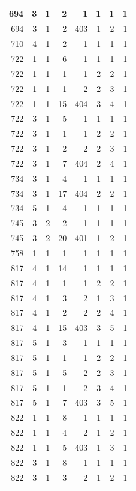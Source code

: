 \documentclass[11pt,]{book}
\begin{document}
\begin{table}
\begin{tabular}[t]{r|r|r|r|r|r|r|r}
\hline
694 & 3 & 1 & 2 & 1 & 1 & 1 & 1\\
\hline
694 & 3 & 1 & 2 & 403 & 1 & 2 & 1\\
\hline
710 & 4 & 1 & 2 & 1 & 1 & 1 & 1\\
\hline
722 & 1 & 1 & 6 & 1 & 1 & 1 & 1\\
\hline
722 & 1 & 1 & 1 & 1 & 2 & 2 & 1\\
\hline
722 & 1 & 1 & 1 & 2 & 2 & 3 & 1\\
\hline
722 & 1 & 1 & 15 & 404 & 3 & 4 & 1\\
\hline
722 & 3 & 1 & 5 & 1 & 1 & 1 & 1\\
\hline
722 & 3 & 1 & 1 & 1 & 2 & 2 & 1\\
\hline
722 & 3 & 1 & 2 & 2 & 2 & 3 & 1\\
\hline
722 & 3 & 1 & 7 & 404 & 2 & 4 & 1\\
\hline
734 & 3 & 1 & 4 & 1 & 1 & 1 & 1\\
\hline
734 & 3 & 1 & 17 & 404 & 2 & 2 & 1\\
\hline
734 & 5 & 1 & 4 & 1 & 1 & 1 & 1\\
\hline
745 & 3 & 2 & 2 & 1 & 1 & 1 & 1\\
\hline
745 & 3 & 2 & 20 & 401 & 1 & 2 & 1\\
\hline
758 & 1 & 1 & 1 & 1 & 1 & 1 & 1\\
\hline
817 & 4 & 1 & 14 & 1 & 1 & 1 & 1\\
\hline
817 & 4 & 1 & 1 & 1 & 2 & 2 & 1\\
\hline
817 & 4 & 1 & 3 & 2 & 1 & 3 & 1\\
\hline
817 & 4 & 1 & 2 & 2 & 2 & 4 & 1\\
\hline
817 & 4 & 1 & 15 & 403 & 3 & 5 & 1\\
\hline
817 & 5 & 1 & 3 & 1 & 1 & 1 & 1\\
\hline
817 & 5 & 1 & 1 & 1 & 2 & 2 & 1\\
\hline
817 & 5 & 1 & 5 & 2 & 2 & 3 & 1\\
\hline
817 & 5 & 1 & 1 & 2 & 3 & 4 & 1\\
\hline
817 & 5 & 1 & 7 & 403 & 3 & 5 & 1\\
\hline
822 & 1 & 1 & 8 & 1 & 1 & 1 & 1\\
\hline
822 & 1 & 1 & 4 & 2 & 1 & 2 & 1\\
\hline
822 & 1 & 1 & 5 & 403 & 1 & 3 & 1\\
\hline
822 & 3 & 1 & 8 & 1 & 1 & 1 & 1\\
\hline
822 & 3 & 1 & 3 & 2 & 1 & 2 & 1\\

\end{tabular}
\end{table}
\end{document}
